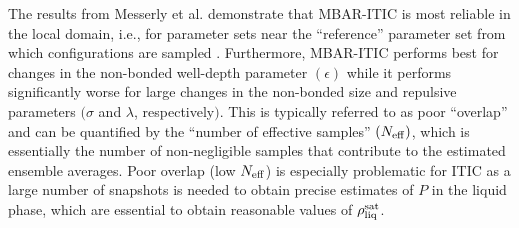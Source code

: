 \documentclass[journal=jced,manuscript=article]{achemso}
\begin{document}



The results from Messerly et al. demonstrate that MBAR-ITIC is most reliable in the local domain, i.e., for parameter sets near the ``reference'' parameter set from which configurations are sampled \cite{Postdoc_1}. Furthermore, MBAR-ITIC performs best for changes in the non-bonded well-depth parameter $(\epsilon)$ while it performs significantly worse for large changes in the non-bonded size and repulsive parameters $(\sigma$ and $\lambda$, respectively$)$. This is typically referred to as poor ``overlap'' and can be quantified by the ``number of effective samples'' $(N_{\rm eff})$, which is essentially the number of non-negligible samples that contribute to the estimated ensemble averages. Poor overlap (low $N_{\rm eff}$) is especially problematic for ITIC as a large number of snapshots is needed to obtain precise estimates of $P$ in the liquid phase, which are essential to obtain reasonable values of $\rho_{\rm liq}^{\rm sat}$.

\end{document}
